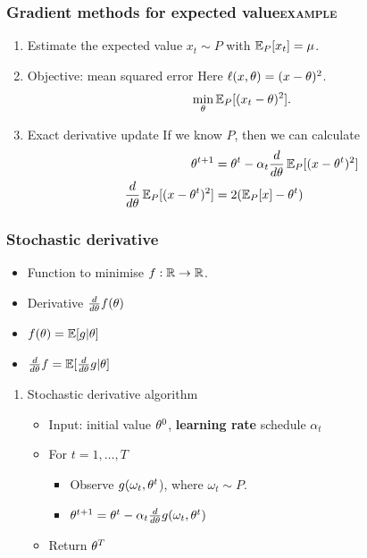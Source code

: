 \documentclass[smaller]{article}
\begin{document}
\subsubsection{Gradient methods for expected value\hfill{}\textsc{example}}
\label{sec:org5af3f52}
\begin{enumerate}
\item Estimate the expected value
\label{sec:org5c711be}
\(x_t \sim P\) with \(\mathop{\mbox{\ensuremath{\mathbb{E}}}}\nolimits_P[x_t] = \mu\).
\item Objective: mean squared error
\label{sec:org0e7e0e4}
Here \(\ell(x, \theta) = (x - \theta)^2\).
\[
\min_\theta \mathop{\mbox{\ensuremath{\mathbb{E}}}}\nolimits_P[(x_t - \theta)^2].
\]
\item Exact derivative update
\label{sec:orgfa520c9}
If we know \(P\), then we can calculate
\begin{align}
\theta^{t+1} &= \theta^t - \alpha_t \frac{d}{d\theta} \mathop{\mbox{\ensuremath{\mathbb{E}}}}\nolimits_P[(x - \theta^t)^2]\\
\frac{d}{d\theta} \mathop{\mbox{\ensuremath{\mathbb{E}}}}\nolimits_P[(x - \theta^t)^2] &= 2 (\mathop{\mbox{\ensuremath{\mathbb{E}}}}\nolimits_P[x] - \theta^t)
\end{align}
\end{enumerate}

\subsubsection{Stochastic derivative}
\label{sec:orgd20c819}
\begin{itemize}
\item Function to minimise \(f : \mathbb{R} \to \mathbb{R}\).
\item Derivative \(\frac{d}{d \theta} f(\theta)\)
\item \(f(\theta) = \mathop{\mbox{\ensuremath{\mathbb{E}}}}\nolimits[g | \theta]\)
\item \(\frac{d}{d \theta} f = \mathop{\mbox{\ensuremath{\mathbb{E}}}}\nolimits[ \frac{d}{d \theta} g | \theta]\)
\end{itemize}
\begin{enumerate}
\item Stochastic derivative algorithm
\label{sec:orgc54509e}
\begin{itemize}
\item Input: initial value \(\theta^0\), \textbf{learning rate} schedule \(\alpha_t\)
\item For \(t=1, \ldots, T\)
\begin{itemize}
\item Observe \(g(\omega_t, \theta^t\)), where \(\omega_t \sim P\).
\item \(\theta^{t+1} = \theta^t - \alpha_t \frac{d}{d \theta} g(\omega_t, \theta^t)\)
\end{itemize}
\item Return \(\theta^T\)
\end{itemize}
\end{enumerate}
\end{document}
